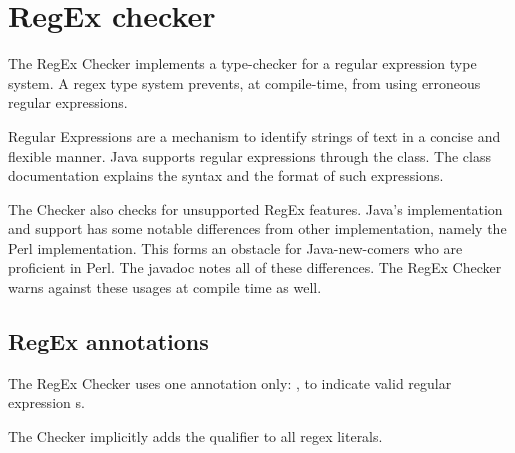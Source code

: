 \htmlhr
\chapter{RegEx checker\label{regex-checker}}

The RegEx Checker implements a type-checker for a regular expression type
system.  A regex type system prevents, at compile-time, from using erroneous
regular expressions.

Regular Expressions are a mechanism to identify strings of text in a concise
and flexible manner.  Java supports regular expressions through the
 class.  The class
documentation explains the syntax and the format of such expressions.

The Checker also checks for unsupported RegEx features.  Java's
implementation and support has some notable differences from
other implementation, namely the Perl implementation.  This forms an
obstacle for Java-new-comers who are proficient in Perl.  The
 javadoc notes all
of these differences.  The RegEx Checker warns against these usages at
compile time as well.

\section{RegEx annotations}

The RegEx Checker uses one annotation only:
, to indicate valid regular expression
s.

The Checker implicitly adds the  qualifier to all
regex  literals.
